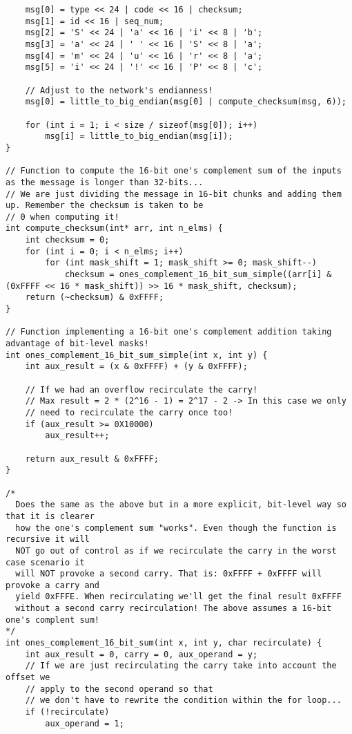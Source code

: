 \documentclass[landscape]{article}
\begin{document}
\begin{verbatim}
    msg[0] = type << 24 | code << 16 | checksum;
    msg[1] = id << 16 | seq_num;
    msg[2] = 'S' << 24 | 'a' << 16 | 'i' << 8 | 'b';
    msg[3] = 'a' << 24 | ' ' << 16 | 'S' << 8 | 'a';
    msg[4] = 'm' << 24 | 'u' << 16 | 'r' << 8 | 'a';
    msg[5] = 'i' << 24 | '!' << 16 | 'P' << 8 | 'c';

    // Adjust to the network's endianness!
    msg[0] = little_to_big_endian(msg[0] | compute_checksum(msg, 6));

    for (int i = 1; i < size / sizeof(msg[0]); i++)
        msg[i] = little_to_big_endian(msg[i]);
}

// Function to compute the 16-bit one's complement sum of the inputs as the message is longer than 32-bits...
// We are just dividing the message in 16-bit chunks and adding them up. Remember the checksum is taken to be
// 0 when computing it!
int compute_checksum(int* arr, int n_elms) {
    int checksum = 0;
    for (int i = 0; i < n_elms; i++)
        for (int mask_shift = 1; mask_shift >= 0; mask_shift--)
            checksum = ones_complement_16_bit_sum_simple((arr[i] & (0xFFFF << 16 * mask_shift)) >> 16 * mask_shift, checksum);
    return (~checksum) & 0xFFFF;
}

// Function implementing a 16-bit one's complement addition taking advantage of bit-level masks!
int ones_complement_16_bit_sum_simple(int x, int y) {
    int aux_result = (x & 0xFFFF) + (y & 0xFFFF);

    // If we had an overflow recirculate the carry!
    // Max result = 2 * (2^16 - 1) = 2^17 - 2 -> In this case we only
    // need to recirculate the carry once too!
    if (aux_result >= 0X10000)
        aux_result++;

    return aux_result & 0xFFFF;
}

/* 
  Does the same as the above but in a more explicit, bit-level way so that it is clearer
  how the one's complement sum "works". Even though the function is recursive it will
  NOT go out of control as if we recirculate the carry in the worst case scenario it
  will NOT provoke a second carry. That is: 0xFFFF + 0xFFFF will provoke a carry and
  yield 0xFFFE. When recirculating we'll get the final result 0xFFFF
  without a second carry recirculation! The above assumes a 16-bit one's complent sum!
*/
int ones_complement_16_bit_sum(int x, int y, char recirculate) {
    int aux_result = 0, carry = 0, aux_operand = y;
    // If we are just recirculating the carry take into account the offset we
    // apply to the second operand so that
    // we don't have to rewrite the condition within the for loop...
    if (!recirculate)
        aux_operand = 1;


\end{verbatim}
\end{document}
